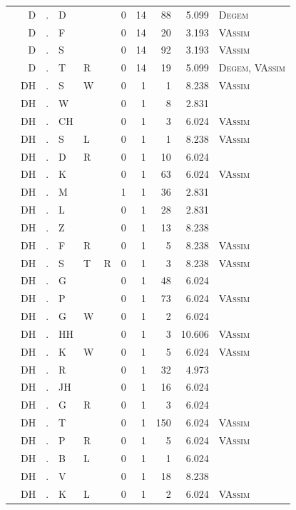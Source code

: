 \documentclass[12pt]{article}
\begin{document}
\begin{longtable}{r@{ } r@{ } c@{ } l@{ } l@{ } l@{ } r r r r l }
 & D & . & D &  &  & 0 & 14 & 88 & 5.099 & \textsc{Degem} \\
 & D & . & F &  &  & 0 & 14 & 20 & 3.193 & \textsc{VAssim} \\
 & D & . & S &  &  & 0 & 14 & 92 & 3.193 & \textsc{VAssim} \\
 & D & . & T & R &  & 0 & 14 & 19 & 5.099 & \textsc{Degem}, \textsc{VAssim} \\
 & DH & . & S & W &  & 0 & 1 & 1 & 8.238 & \textsc{VAssim} \\
 & DH & . & W &  &  & 0 & 1 & 8 & 2.831 &  \\
 & DH & . & CH &  &  & 0 & 1 & 3 & 6.024 & \textsc{VAssim} \\
 & DH & . & S & L &  & 0 & 1 & 1 & 8.238 & \textsc{VAssim} \\
 & DH & . & D & R &  & 0 & 1 & 10 & 6.024 &  \\
 & DH & . & K &  &  & 0 & 1 & 63 & 6.024 & \textsc{VAssim} \\
 & DH & . & M &  &  & 1 & 1 & 36 & 2.831 &  \\
 & DH & . & L &  &  & 0 & 1 & 28 & 2.831 &  \\
 & DH & . & Z &  &  & 0 & 1 & 13 & 8.238 &  \\
 & DH & . & F & R &  & 0 & 1 & 5 & 8.238 & \textsc{VAssim} \\
 & DH & . & S & T & R & 0 & 1 & 3 & 8.238 & \textsc{VAssim} \\
 & DH & . & G &  &  & 0 & 1 & 48 & 6.024 &  \\
 & DH & . & P &  &  & 0 & 1 & 73 & 6.024 & \textsc{VAssim} \\
 & DH & . & G & W &  & 0 & 1 & 2 & 6.024 &  \\
 & DH & . & HH &  &  & 0 & 1 & 3 & 10.606 & \textsc{VAssim} \\
 & DH & . & K & W &  & 0 & 1 & 5 & 6.024 & \textsc{VAssim} \\
 & DH & . & R &  &  & 0 & 1 & 32 & 4.973 &  \\
 & DH & . & JH &  &  & 0 & 1 & 16 & 6.024 &  \\
 & DH & . & G & R &  & 0 & 1 & 3 & 6.024 &  \\
 & DH & . & T &  &  & 0 & 1 & 150 & 6.024 & \textsc{VAssim} \\
 & DH & . & P & R &  & 0 & 1 & 5 & 6.024 & \textsc{VAssim} \\
 & DH & . & B & L &  & 0 & 1 & 1 & 6.024 &  \\
 & DH & . & V &  &  & 0 & 1 & 18 & 8.238 &  \\
 & DH & . & K & L &  & 0 & 1 & 2 & 6.024 & \textsc{VAssim} \\

\end{longtable}
\end{document}
